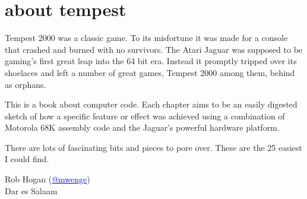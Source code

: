 \chapter*{about tempest} 
Tempest 2000 was a classic game. To its misfortune it was made for a console that crashed and burned with no
survivors. The Atari Jaguar was supposed to be gaming's first great leap into the 64 bit era. Instead it 
promptly tripped over its shoelaces and left a number of great games, Tempest 2000 among them, behind
as orphans.

This is a book about computer code. Each chapter aims to be an easily digested sketch of how
a specific feature or effect was achieved using a combination of Motorola 68K assembly code and
the Jaguar's powerful hardware platform.

There are lots of fascinating bits and pieces to pore over. These are the 25 easiest I could find.

Rob Hogan (\href{https://mastodon.social/@mwenge}{\textcolor{blue}{@mwenge}})\\
Dar es Salaam \the\year{} \\

